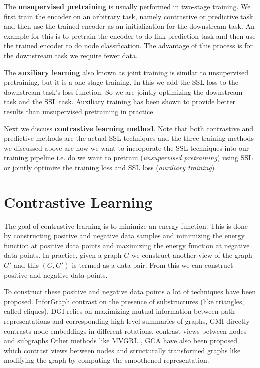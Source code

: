 \documentclass{article}
\begin{document}
The \textbf{unsupervised pretraining} is usually performed in two-stage training. We first train the encoder on an arbitrary task, namely contrastive or predictive task and then use the trained encoder as an initialization for the downstream task. An example for this is to pretrain the encoder to do link prediction task and then use the trained encoder to do node classification. The advantage of this process is for the downstream task we require fewer data.

The \textbf{auxiliary learning} also known as joint training is similar to unsupervised pretraining, but it is a one-stage training. In this we add the SSL loss to the downstream task's loss function. So we are jointly optimizing the downstream task and the SSL task. Auxiliary training has been shown to provide better results than unsupervised pretraining in practice.

Next we discuss \textbf{contrastive learning method}. Note that both contrastive and predictive methods are the actual SSL techniques and the three training methods we discussed above are how we want to incorporate the SSL techniques into our training pipeline i.e. do we want to pretrain (\textit{unsupervised pretraining}) using SSL or jointly optimize the training loss and SSL loss (\textit{auxiliary training}) 

\section{Contrastive Learning}
The goal of contrastive learning is to minimize an energy function. This is done by constructing positive and negative data samples and minimizing the energy function at positive data points and maximizing the energy function at negative data points. In practice, given a graph $G$ we construct another view of the graph $G'$ and this $(G, G')$ is termed as a data pair. From this we can construct positive and negative data points.

To construct these positive and negative data points a lot of techniques have been proposed. InforGraph \citep{cite14} contrast on the presence of substructures (like triangles, called cliques), DGI \citep{cite15} relies on maximizing mutual information between path representations and corresponding high-level summaries of graphs, GMI \citep{cite16} directly contrasts node embeddings in different rotations. \citep{cite17, cite18} contrast views between nodes and subgraphs Other methods like MVGRL \citep{cite19}, GCA \citep{cite16} have also been proposed which contrast views between nodes and structurally transformed graphs like modifying the graph by computing the smoothened representation.
\end{document}

